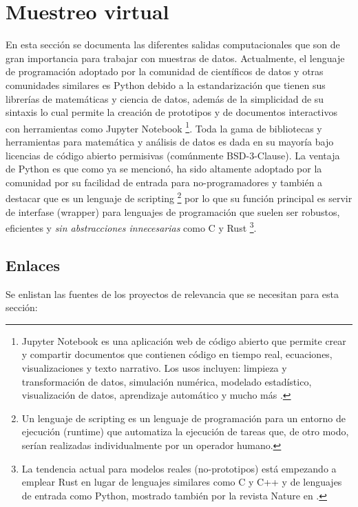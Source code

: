 \documentclass{report}
\begin{document}
\section{Muestreo virtual}

En esta sección se documenta las diferentes salidas computacionales que son de gran importancia para trabajar con muestras de datos. Actualmente, el lenguaje de programación adoptado por la comunidad de científicos de datos y otras comunidades similares es Python debido a la estandarización que tienen sus librerías de matemáticas y ciencia de datos, además de la simplicidad de su sintaxis lo cual permite la creación de prototipos y de documentos interactivos con herramientas como Jupyter Notebook \footnote{Jupyter Notebook es una aplicación web de código abierto que permite crear y compartir documentos que contienen código en tiempo real, ecuaciones, visualizaciones y texto narrativo. Los usos incluyen: limpieza y transformación de datos, simulación numérica, modelado estadístico, visualización de datos, aprendizaje automático y mucho más \cite{jupyter-2021}.}. Toda la gama de bibliotecas y herramientas para matemática y análisis de datos es dada en su mayoría bajo licencias de código abierto permisivas (comúnmente BSD-3-Clause). La ventaja de Python es que como ya se mencionó, ha sido altamente adoptado por la comunidad por su facilidad de entrada para no-programadores y también a destacar que es un lenguaje de scripting \footnote{Un lenguaje de scripting es un lenguaje de programación para un entorno de ejecución (runtime) que automatiza la ejecución de tareas que, de otro modo, serían realizadas individualmente por un operador humano.} por lo que su función principal es servir de interfase (wrapper) para lenguajes de programación que suelen ser robustos, eficientes y \textit{sin abstracciones innecesarias} como C y Rust \footnote{La tendencia actual para modelos reales (no-prototipos) está empezando a emplear Rust en lugar de lenguajes similares como C y C++ y de lenguajes de entrada como Python, mostrado también por la revista Nature en  \cite{nature-editorial-2020}.}.

\subsection{Enlaces}

Se enlistan las fuentes de los proyectos de relevancia que se necesitan para esta sección:
\end{document}
